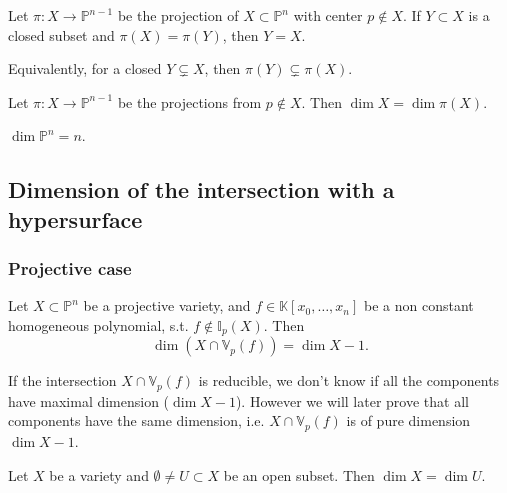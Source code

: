 \begin{lem}
	Let $\pi: X \to \mathbb{P}^{n-1}$ be the projection of $X \subset \mathbb{P}^{n}$ with center $p \notin X$.
	If $Y \subset X$ is a closed subset and $\pi(X) = \pi(Y)$, then $Y = X$.
\end{lem} 
\begin{rem}[]
	Equivalently, for a closed $Y \subsetneq X$, then $\pi(Y) \subsetneq \pi(X)$.
\end{rem}

\begin{cor}
	Let $\pi: X \to \mathbb{P}^{n-1}$ be the projections from $p \notin X$.
	Then $\dim X = \dim \pi(X)$.
\end{cor} 
\begin{cor}
	$\dim \mathbb{P}^{n} = n$.
\end{cor} 

\subsection{Dimension of the intersection with a hypersurface}
\subsubsection{Projective case}
\begin{prop}
	Let $X \subset \mathbb{P}^{n}$ be a projective variety, and $f \in \mathbb{K}\left[x_0, \ldots, x_n \right]$
	be a non constant homogeneous polynomial, s.t. $f \notin \mathbb{I}_p(X)$.
	Then
	 \begin{equation}
		 \dim \left( X \cap \mathbb{V}_p\left( f \right) \right) = \dim X - 1
	.\end{equation} 
\end{prop} 
\begin{rem}[]
	If the intersection $X \cap \mathbb{V}_p\left( f \right)$ is reducible,
	we don't know if all the components have maximal dimension ($\dim X - 1$).
	However we will later prove that all components have the same dimension,
	i.e. $X \cap \mathbb{V}_p\left( f \right)$ is of pure dimension $\dim X - 1$.
\end{rem}

\begin{prop}
	Let $X$ be a variety and $\emptyset \neq U \subset X$ be an open subset.
	Then $\dim X = \dim U$.
\end{prop}  

